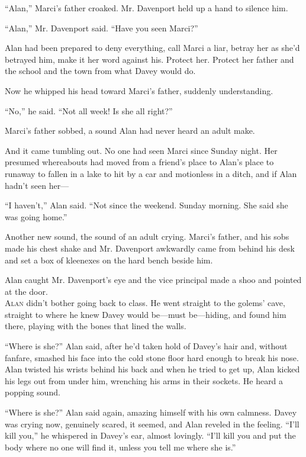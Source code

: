 ``Alan,'' Marci's father croaked.  Mr.  Davenport held up a hand to
silence him.

``Alan,'' Mr.  Davenport said.  ``Have you seen Marci?''

Alan had been prepared to deny everything, call Marci a liar, betray
her as she'd betrayed him, make it her word against his.  Protect her. 
Protect her father and the school and the town from what Davey would
do.

Now he whipped his head toward Marci's father, suddenly understanding.

``No,'' he said.  ``Not all week!  Is she all right?''

Marci's father sobbed, a sound Alan had never heard an adult make.

And it came tumbling out.  No one had seen Marci since Sunday night. 
Her presumed whereabouts had moved from a friend's place to Alan's
place to runaway to fallen in a lake to hit by a car and motionless in
a ditch, and if Alan hadn't seen her---

``I haven't,'' Alan said.  ``Not since the weekend.  Sunday morning. 
She said she was going home.''

Another new sound, the sound of an adult crying.  Marci's father, and
his sobs made his chest shake and Mr.  Davenport awkwardly came from
behind his desk and set a box of kleenexes on the hard bench beside
him.

Alan caught Mr.  Davenport's eye and the vice principal made a shoo
and pointed at the door.
\\
\lettrine[lines=3, lhang=.5, nindent=0pt, findent=2pt]{A}{lan} didn't bother going back to class.  He went straight to the
golems' cave, straight to where he knew Davey would be---must
be---hiding, and found him there, playing with the bones that lined
the walls.

``Where is she?'' Alan said, after he'd taken hold of Davey's hair
and, without fanfare, smashed his face into the cold stone floor hard
enough to break his nose.  Alan twisted his wrists behind his back and
when he tried to get up, Alan kicked his legs out from under him,
wrenching his arms in their sockets.  He heard a popping sound.

``Where is she?'' Alan said again, amazing himself with his own
calmness.  Davey was crying now, genuinely scared, it seemed, and Alan
reveled in the feeling.  ``I'll kill you,'' he whispered in Davey's
ear, almost lovingly.  ``I'll kill you and put the body where no one
will find it, unless you tell me where she is.''

